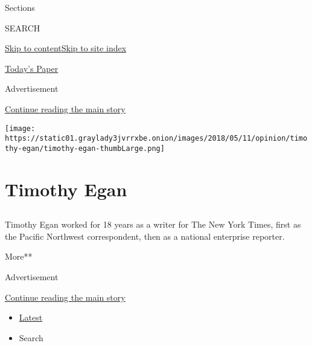 Sections

SEARCH

\protect\hyperlink{site-content}{Skip to
content}\protect\hyperlink{site-index}{Skip to site index}

\href{https://myaccount.nytimes3xbfgragh.onion/auth/login?response_type=cookie\&client_id=vi}{}

\href{https://www.nytimes3xbfgragh.onion/section/todayspaper}{Today's
Paper}

Advertisement

\protect\hyperlink{after-top}{Continue reading the main story}

\texttt{[image: https://static01.graylady3jvrrxbe.onion/images/2018/05/11/opinion/timothy-egan/timothy-egan-thumbLarge.png]}

\hypertarget{timothy-egan}{%
\section{Timothy Egan}\label{timothy-egan}}

\subsection{}

Timothy Egan worked for 18 years as a writer for The New York Times,
first as the Pacific Northwest correspondent, then as a national
enterprise reporter.

More**

Advertisement

\protect\hyperlink{after-mid1}{Continue reading the main story}

\begin{itemize}
\tightlist
\item
  \protect\hyperlink{stream-panel}{Latest}
\item
  Search
\end{itemize}

